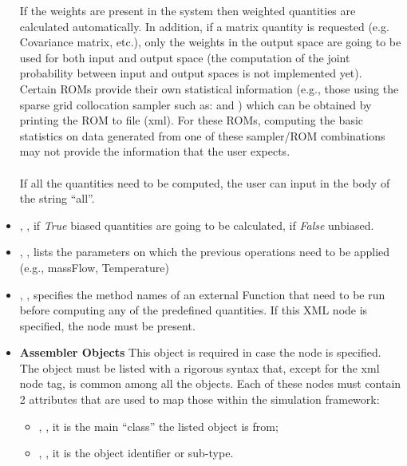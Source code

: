 \begin{itemize}
  \nb If the weights are present in the system then weighted quantities are calculated automatically. In addition, if a matrix quantity is requested (e.g. Covariance matrix, etc.), only the weights in the output space are going to be used for both input and output space (the computation of the joint probability between input and output spaces is not implemented yet).
  \\
  \nb Certain ROMs provide their own statistical information (e.g., those using
  the sparse grid collocation sampler such as: 
  and ) which can be obtained by printing the ROM to file
  (xml). For these ROMs, computing the basic statistics on data generated from
  one of these sampler/ROM combinations may not provide the information that the
  user expects.
  \\
  \\  If all the quantities need to be computed, the user can input in the body of
   the string ``all''.
  \item {}, , if \textit{True} biased
  quantities are going to be calculated, if \textit{False} unbiased.
  \item {}, ,
  lists the parameters on which the previous operations need to be applied
  (e.g., massFlow, Temperature)
  \item {}, , specifies the method names of an external Function that need to be run
  before computing any of the predefined quantities.
  If this XML node is specified, the  node must be present.
  \item \textbf{Assembler Objects} This object is required in case the  
  node is specified.
  The object must be listed with a rigorous syntax that, except for the xml
  node tag, is common among all the objects.
  Each of these nodes must contain 2 attributes that are used to map those
  within the simulation framework:
  \begin{itemize}
    \item {}, , it is the main
    ``class'' the listed object is from;
    \item {}, , it is the object
    identifier or sub-type.

\end{itemize}
\end{itemize}
